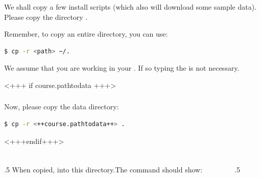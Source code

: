 \begin{frame}[fragile]
    \frametitle{}
    We shall copy a few install scripts (which also will download some sample data).\newline
    Please copy the directory .\newline
    \begin{hint}
        Remember, to copy an entire directory, you can use:
        \begin{lstlisting}[language=Bash, style=Shell]
            $ cp -r <path> ~/.
        \end{lstlisting}
        We assume that you are working in your . If so typing the  is not necessary.
    \end{hint} 
\end{frame}

<+++ if course.pathtodata +++>
\begin{frame}[fragile]
    \frametitle{}
    Now, please copy the data directory:
    \begin{lstlisting}[language=Bash, style=Shell]
$ cp -r <++course.pathtodata++> .
    \end{lstlisting}
\end{frame}
<+++endif+++>

\begin{frame}[fragile]
  \frametitle{}
  \begin{columns}[t]
	 \begin{column}{.5\textwidth}
		When copied,  into this directory.\newline The command  should show:
	 \end{column}
	 \begin{column}{.5\textwidth}
	   \begin{minipage}[t]{0.5\textwidth}
		 {\footnotesize \DTsetlength{0.2em}{1em}{0.2em}{0.4pt}{.6pt}
			 }
      \end{minipage}
	\end{column}
  \end{columns}
\end{frame}


